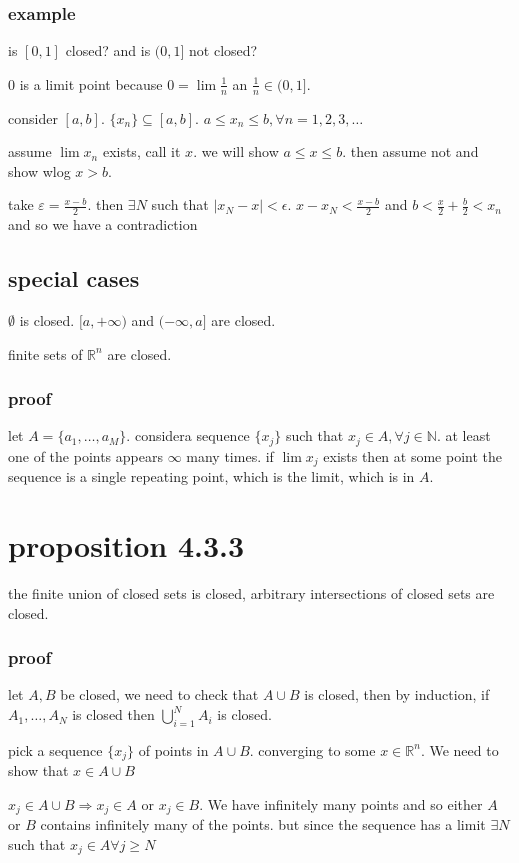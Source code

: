 \documentclass[letterpaper]{article}
\begin{document}
\subsubsection*{example}
is $[0,1]$ closed? and is $(0,1]$ not closed?

0 is a limit point because $0=\lim \frac{1}{n}$ an $\frac{1}{n}\in(0,1]$.

consider $[a,b]$. $\{x_n\}\subseteq[a,b]$. $a\le x_n\le b, \forall n=1,2,3,\dots$

assume $\lim x_n$ exists, call it $x$. we will show $a\le x\le b$.  then assume not and show wlog $x>b$.

take $\varepsilon=\frac{x-b}{2}$. then $\exists N$ such that $|x_N-x|<\epsilon$. $x-x_N<\frac{x-b}{2}$ and $b<\frac{x}{2}+\frac{b}{2}<x_n$ and so we have a contradiction


\subsection*{special cases}
$\emptyset$ is closed. $[a,+\infty)$ and $(-\infty,a]$ are closed.

finite sets of $\mathbb{R}^n$ are closed.
\subsubsection*{proof}
let $A=\{a_1,\dots,a_M\}$. considera sequence $\{x_j\}$ such that $x_j\in A,\forall j\in \mathbb{N}$. at least one of the points appears $\infty$ many times. if $\lim x_j$ exists then at some point the sequence is a single repeating point, which is the limit, which is in $A$.

\section*{proposition 4.3.3}
the finite union of closed sets is closed, arbitrary  intersections of closed sets are closed.

\subsubsection*{proof}
let $A,B$ be closed, we need to check that $A\cup B$ is closed, then by induction, if $A_1,\dots,A_N$ is closed then $\bigcup_{i=1}^NA_i$ is closed.

pick a sequence $\{x_j\}$ of points in $A\cup B$. converging to some $x\in \mathbb{R}^n$. We need to show that $x\in A\cup B$

$x_j\in A\cup B\Rightarrow x_j\in A$ or $x_j\in B$. We have infinitely many points and so either $A$ or $B$ contains infinitely many of the points. but since the sequence has a limit $\exists N$ such that $x_j\in A\forall j\ge N$
\end{document}
